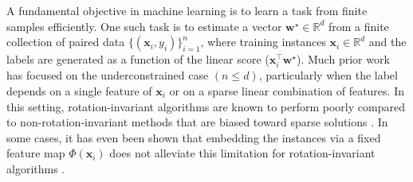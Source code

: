 \documentclass{article}
\theoremstyle{plain}
\theoremstyle{definition}
\theoremstyle{remark}
\begin{document}
A fundamental objective in machine learning is to learn a task from finite samples efficiently.
One such task is to estimate a vector $\mathbf{w}^{\star} \in \mathbb{R}^{d}$ from a finite collection of paired data $\{(\mathbf{x}_{i},y_{i})\}_{i=1}^n$, where training instances $\mathbf{x}_{i} \in \mathbb{R}^{d}$ and the labels are generated as a function of the linear score ($\mathbf{x}_i^\top \mathbf{w}^{\star}$). Much prior work has focused on the underconstrained case $(n \leq  d)$, particularly when the label depends on a single feature of $\mathbf{x}_i$ or on a sparse linear combination of features. In this setting, rotation-invariant algorithms are known to perform poorly compared to non-rotation-invariant methods that are biased toward sparse solutions \cite{warmuth2005leaving,ng2004feature,arora-conv,warmuth2021case}. In some cases, it has even been shown that embedding the instances via a fixed feature map $\Phi(\mathbf{x}_i)$ does not alleviate this limitation for rotation-invariant algorithms \cite{warmuth2005leaving}.
\end{document}

